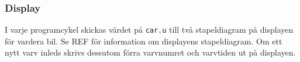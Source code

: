 \subsubsection{Display}

I varje programcykel skickas värdet på \texttt{car.u} till två stapeldiagram på
displayen för vardera bil. Se REF för information om displayens
stapeldiagram. Om ett nytt varv inleds skrivs dessutom förra varvnumret och
varvtiden ut på displayen.
